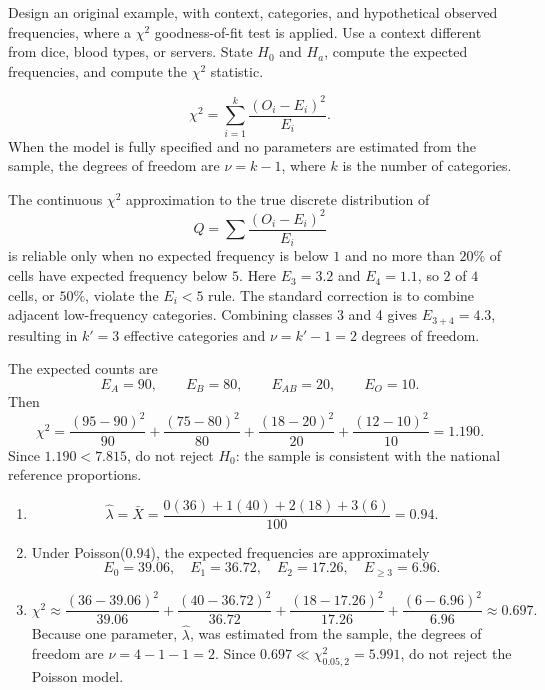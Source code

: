 \begin{problema}\label{prob:369a6a1}
Design an original example, with context, categories, and hypothetical observed frequencies, where a $\chi^2$ goodness-of-fit test is applied. Use a context different from dice, blood types, or servers. State $H_0$ and $H_a$, compute the expected frequencies, and compute the $\chi^2$ statistic.
\end{problema}

\begin{solproblema}[prob:3f1ec07]
\[
	\chi^2=\sum_{i=1}^k\frac{(O_i-E_i)^2}{E_i}.
\]
When the model is fully specified and no parameters are estimated from the sample, the degrees of freedom are $\nu=k-1$, where $k$ is the number of categories.
\end{solproblema}

\begin{solproblema}[prob:d4859df]
The continuous $\chi^2$ approximation to the true discrete distribution of
\[
	Q=\sum\frac{(O_i-E_i)^2}{E_i}
\]
is reliable only when no expected frequency is below $1$ and no more than $20\%$ of cells have expected frequency below $5$. Here $E_3=3.2$ and $E_4=1.1$, so $2$ of $4$ cells, or $50\%$, violate the $E_i<5$ rule. The standard correction is to combine adjacent low-frequency categories. Combining classes 3 and 4 gives $E_{3+4}=4.3$, resulting in $k'=3$ effective categories and $\nu=k'-1=2$ degrees of freedom.
\end{solproblema}

\begin{solproblema}[prob:da2eb15]
The expected counts are
\[
	E_A=90,\qquad E_B=80,\qquad E_{AB}=20,\qquad E_O=10.
\]
Then
\[
	\chi^2=\frac{(95-90)^2}{90}+\frac{(75-80)^2}{80}
	+\frac{(18-20)^2}{20}+\frac{(12-10)^2}{10}
	=1.190.
\]
Since $1.190<7.815$, do not reject $H_0$: the sample is consistent with the national reference proportions.
\end{solproblema}

\begin{solproblema}[prob:d6f0154]
\begin{enumerate}[label=(\alph*)]
	\item
	\[
		\hat\lambda=\bar X=\frac{0(36)+1(40)+2(18)+3(6)}{100}=0.94.
	\]
	\item Under Poisson($0.94$), the expected frequencies are approximately
	\[
		E_0=39.06,\quad E_1=36.72,\quad E_2=17.26,\quad E_{\ge3}=6.96.
	\]
	\item
	\[
		\chi^2\approx
		\frac{(36-39.06)^2}{39.06}
		+\frac{(40-36.72)^2}{36.72}
		+\frac{(18-17.26)^2}{17.26}
		+\frac{(6-6.96)^2}{6.96}
		\approx0.697.
	\]
	Because one parameter, $\hat\lambda$, was estimated from the sample, the degrees of freedom are $\nu=4-1-1=2$. Since $0.697\ll\chi^2_{0.05,2}=5.991$, do not reject the Poisson model.
\end{enumerate}
\end{solproblema}

